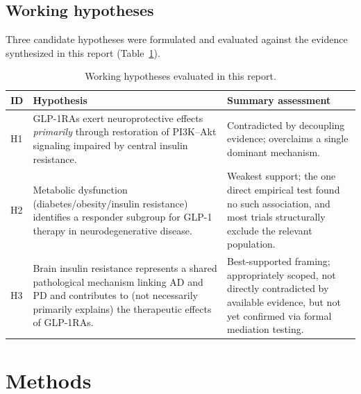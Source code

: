 \documentclass[11pt, a4paper]{article}
\begin{document}
\subsection{Working hypotheses}
Three candidate hypotheses were formulated and evaluated against the
evidence synthesized in this report (Table~\ref{tab:hypotheses}).

\begin{table}[h]
\centering
\caption{Working hypotheses evaluated in this report.}
\label{tab:hypotheses}
\begin{tabular}{@{}p{}p{}p{}@{}}
\toprule
\textbf{ID} & \textbf{Hypothesis} & \textbf{Summary assessment} \\
\midrule
H1 & GLP-1RAs exert neuroprotective effects \emph{primarily} through
restoration of PI3K--Akt signaling impaired by central insulin resistance. &
Contradicted by decoupling evidence; overclaims a single dominant mechanism. \\[4pt]
H2 & Metabolic dysfunction (diabetes/obesity/insulin resistance) identifies
a responder subgroup for GLP-1 therapy in neurodegenerative disease. &
Weakest support; the one direct empirical test found no such association,
and most trials structurally exclude the relevant population. \\[4pt]
H3 & Brain insulin resistance represents a shared pathological mechanism
linking AD and PD and contributes to (not necessarily primarily explains)
the therapeutic effects of GLP-1RAs. & Best-supported framing; appropriately
scoped, not directly contradicted by available evidence, but not yet
confirmed via formal mediation testing. \\
\bottomrule
\end{tabular}
\end{table}

\section{Methods}
\label{sec:methods}
\end{document}
